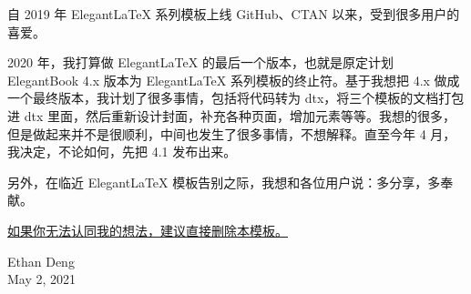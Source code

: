 \documentclass[../main.tex]{subfiles}
\begin{document}

    自 2019 年 Elegant\LaTeX{} 系列模板上线 GitHub、CTAN 以来，受到很多用户的喜爱。

    2020 年，我打算做 Elegant\LaTeX{} 的最后一个版本，也就是原定计划 ElegantBook 4.x 版本为 Elegant\LaTeX{} 系列模板的终止符。基于我想把 4.x 做成一个最终版本，我计划了很多事情，包括将代码转为 dtx，将三个模板的文档打包进 dtx 里面，然后重新设计封面，补充各种页面，增加元素等等。我想的很多，但是做起来并不是很顺利，中间也发生了很多事情，不想解释。直至今年 4 月，我决定，不论如何，先把 4.1 发布出来。

    \vskip 0.5cm

    另外，在临近 Elegant\LaTeX{} 模板告别之际，我想和各位用户说：多分享，多奉献。

    \vskip 0.5cm

    \underline{如果你无法认同我的想法，建议直接删除本模板。}

    \vskip 1.5cm

    \begin{flushright}
    Ethan Deng\\
    May 2, 2021
    \end{flushright}
\end{document}
